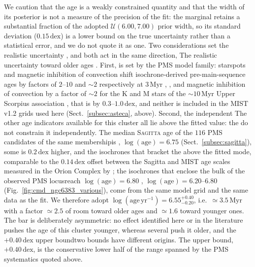\documentclass{aa}
\providecommand{\DIFaddtex}[1]{{\protect\color[rgb]{0,0,0.7}#1}} %
\providecommand{\DIFdeltex}[1]{{\protect\color[rgb]{0.65,0,0}\footnotesize #1}} %
\providecommand{\DIFaddbegin}{} %
\providecommand{\DIFaddend}{} %
\providecommand{\DIFdelbegin}{} %
\providecommand{\DIFdelend}{} %
\providecommand{\DIFadd}[1]{\texorpdfstring{\DIFaddtex{#1}}{#1}} %
\providecommand{\DIFdel}[1]{\texorpdfstring{\DIFdeltex{#1}}{}} %
\providecommand{\DIFscaledelfig}{0.5}
\newlength{\DIFdelgraphicswidth} %
\newlength{\DIFdelgraphicsheight} %
\providecommand{\DIFaddincludegraphics}[2][]{{\color{blue}\fbox{\DIFOincludegraphics[#1]{#2}}}} %
\providecommand{\DIFdelincludegraphics}[2][]{%
\sbox{\DIFdelgraphicsbox}{\DIFOincludegraphics[#1]{#2}}%
\settoboxwidth{\DIFdelgraphicswidth}{\DIFdelgraphicsbox} %
\settoboxtotalheight{\DIFdelgraphicsheight}{\DIFdelgraphicsbox} %
\scalebox{\DIFscaledelfig}{%
\parbox[b]{\DIFdelgraphicswidth}{\usebox{\DIFdelgraphicsbox}\\[-\baselineskip] \rule{\DIFdelgraphicswidth}{0em}}\llap{\resizebox{\DIFdelgraphicswidth}{\DIFdelgraphicsheight}{%
\setlength{\unitlength}{\DIFdelgraphicswidth}%
\begin{picture}(1,1)%
\thicklines\linethickness{2pt} %
{\color[rgb]{1,0,0}\put(0,0){\framebox(1,1){}}}%
{\color[rgb]{1,0,0}\put(0,0){\line( 1,1){1}}}%
{\color[rgb]{1,0,0}\put(0,1){\line(1,-1){1}}}%
\end{picture}%
}\hspace*{3pt}}} %
} %
\DeclareRobustCommand{\DIFaddbegin}{\DIFOaddbegin \let\includegraphics\DIFaddincludegraphics} %
\DeclareRobustCommand{\DIFaddend}{\DIFOaddend \let\includegraphics\DIFOincludegraphics} %
\DeclareRobustCommand{\DIFdelbegin}{\DIFOdelbegin \let\includegraphics\DIFdelincludegraphics} %
\DeclareRobustCommand{\DIFdelend}{\DIFOaddend \let\includegraphics\DIFOincludegraphics} %
\begin{document}
We caution that the age is a weakly constrained quantity and that the width of its posterior is not a measure of the precision of the fit: the marginal retains a substantial fraction of the adopted $\mathcal{U}(6.00,7.00)$ prior width, so its standard deviation ($0.15\,\mathrm{dex}$) is a lower bound on the true uncertainty rather than a statistical error, and we do not quote it as one. \DIFdelbegin \DIFdel{Two considerations set the realistic uncertainty , and both act in the same direction, }\DIFdelend \DIFaddbegin \DIFadd{The realistic uncertainty }\DIFaddend toward older ages \DIFdelbegin \DIFdel{. First, }\DIFdelend \DIFaddbegin \DIFadd{is set by }\DIFaddend the PMS model family: starspots \DIFdelbegin \DIFdel{and magnetic inhibition of convection }\DIFdelend shift isochrone-derived pre-main-sequence ages by factors of $2$--$10$ \DIFdelbegin \DIFdel{and $\sim2$ respectively }\DIFdelend at $3\,\mathrm{Myr}$ \DIFdelbegin \DIFdel{\citep{2015ApJ...807..174S,2016A&A...593A..99F}, }\DIFdelend \DIFaddbegin \DIFadd{\citep{2015ApJ...807..174S}, and magnetic inhibition of convection by a factor of $\sim2$ for the K and M stars of the $\sim10\,\mathrm{Myr}$ Upper Scorpius association \citep{2016A&A...593A..99F}, }\DIFaddend that is by $0.3$--$1.0\,\mathrm{dex}$, and neither is included in the \textsc{MIST} v1.2 grids used here (Sect.~\ref{subsec:asteca}, above). \DIFdelbegin \DIFdel{Second, the independent }\DIFdelend \DIFaddbegin \DIFadd{The other age }\DIFaddend indicators available for this cluster \DIFdelbegin \DIFdel{all lie above the fitted value: the }\DIFdelend \DIFaddbegin \DIFadd{do not constrain it independently. The }\DIFaddend median \textsc{Sagitta} age of the $116$ PMS candidates of the same membership\DIFdelbegin \DIFdel{is }\DIFdelend \DIFaddbegin \DIFadd{, }\DIFaddend $\log(\mathrm{age})=6.75$ (Sect.~\ref{subsec:sagitta}), \DIFdelbegin \DIFdel{some }\DIFdelend \DIFaddbegin \DIFadd{is }\DIFaddend $0.2\,\mathrm{dex}$ \DIFdelbegin \DIFdel{higher, and the isochrones that bracket the }\DIFdelend \DIFaddbegin \DIFadd{above the fitted mode, comparable to the $0.14\,\mathrm{dex}$ offset between the Sagitta and \textsc{MIST} age scales measured in the Orion Complex by \citet{2023AJ....165..182K}; the isochrones that enclose the bulk of the }\DIFaddend observed PMS locus\DIFdelbegin \DIFdel{reach $\log(\mathrm{age})=6.80$ }\DIFdelend \DIFaddbegin \DIFadd{, $\log(\mathrm{age})=6.20$--$6.80$ }\DIFaddend (Fig.~\ref{fig:cmd_ngc6383_various})\DIFaddbegin \DIFadd{, come from the same model grid and the same data as the fit}\DIFaddend . We therefore adopt $\log(\mathrm{age}\,\mathrm{yr^{-1}}) = 6.55^{+0.40}_{-0.20}$, i.e.\ $\simeq3.5\,\mathrm{Myr}$ with a factor $\simeq2.5$ of room toward older ages and $\simeq1.6$ toward younger ones. The \DIFdelbegin \DIFdel{bar is deliberately asymmetric: no effect identified here or in the literature pushes the age of this cluster younger, whereas several push it older, and the $+0.40\,\mathrm{dex}$ upper bound}\DIFdelend \DIFaddbegin \DIFadd{two bounds have different origins. The upper bound, $+0.40\,\mathrm{dex}$, }\DIFaddend is the conservative lower half of the range spanned by the PMS systematics quoted above\DIFdelbegin \DIFdel{.
}
\end{document}
